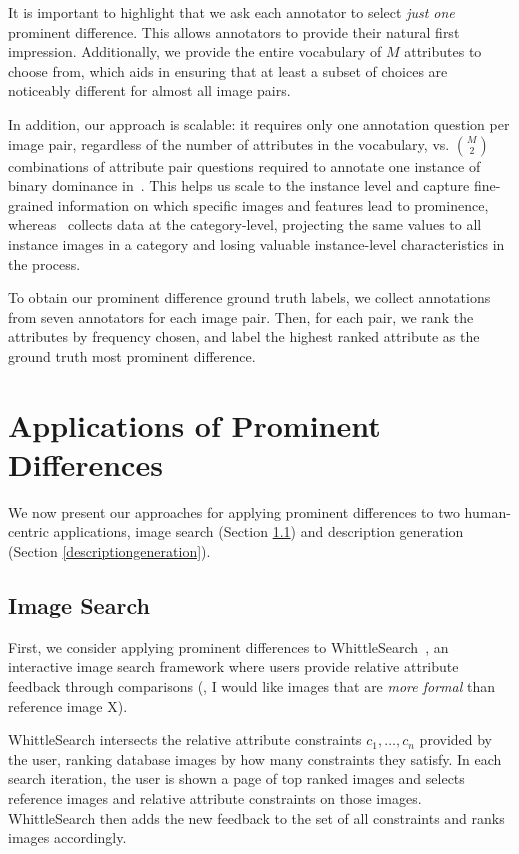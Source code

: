 \documentclass[10pt,twocolumn,letterpaper]{article}
\begin{document}
It is important to highlight that we ask each annotator to select \textit{just one} prominent difference. This allows annotators to provide their natural first impression. Additionally, we provide the entire vocabulary of $M$ attributes to choose from, which aids in ensuring that at least a subset of choices are noticeably different for almost all image pairs. 

In addition, our approach is scalable: it requires only one annotation question per image pair, regardless of the number of attributes in the vocabulary, vs. $\binom{M}{2}$ combinations of attribute pair questions required to annotate one instance of binary dominance in~\cite{dominance}. This helps us scale to the instance level and capture fine-grained information on which specific images and features lead to prominence, whereas~\cite{dominance} collects data at the category-level, projecting the same values to all instance images in a category and losing valuable instance-level characteristics in the process.

To obtain our prominent difference ground truth labels, we collect annotations from seven annotators for each image pair. Then, for each pair, we rank the attributes by frequency chosen, and label the highest ranked attribute as the ground truth most prominent difference.


\section{Applications of Prominent Differences}

We now present our approaches for applying prominent differences to two human-centric applications, image search (Section \ref{imagesearch}) and description generation (Section \ref{descriptiongeneration}).

\subsection{Image Search} \label{imagesearch}

First, we consider applying prominent differences to WhittleSearch~\cite{whittlesearch, whittlesearch2}, an interactive image search framework where users provide relative attribute feedback through comparisons (\eg, I would like images that are \textit{more formal} than reference image X).

WhittleSearch intersects the relative attribute constraints $c_1, \dotsc, c_n$ provided by the user, ranking database images by how many constraints they satisfy. In each search iteration, the user is shown a page of top ranked images and selects reference images and relative attribute constraints on those images. WhittleSearch then adds the new feedback to the set of all constraints and ranks images accordingly.
\end{document}
